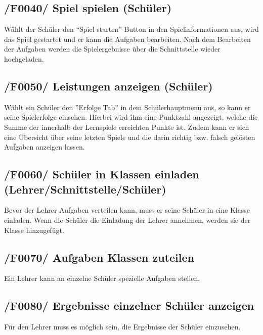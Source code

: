 \subsection{/F0040/ Spiel spielen (Schüler)}
Wählt der Schüler den “Spiel starten” Button in den Spielinformationen aus, wird das Spiel gestartet und  er kann die Aufgaben bearbeiten. Nach dem Bearbeiten der Aufgaben werden die Spielergebnisse über die Schnittstelle wieder hochgeladen.



\subsection{/F0050/ Leistungen anzeigen (Schüler)}
Wählt ein Schüler den ''Erfolge Tab'' in dem Schülerhauptmenü aus, so kann er seine Spielerfolge einsehen. Hierbei wird ihm eine Punktzahl angezeigt, welche die Summe der innerhalb der Lernspiele erreichten Punkte ist. Zudem kann er sich eine Übersicht über seine letzten Spiele und die darin richtig bzw. falsch gelösten Aufgaben anzeigen lassen.

\subsection{/F0060/ Schüler in Klassen einladen (Lehrer/Schnittstelle/Schüler)}
Bevor der Lehrer Aufgaben verteilen kann, muss er seine Schüler in eine Klasse einladen. Wenn die Schüler die Einladung der Lehrer annehmen, werden sie der Klasse hinzugefügt.

\subsection{/F0070/ Aufgaben Klassen zuteilen}
Ein Lehrer kann an einzelne Schüler spezielle Aufgaben stellen.

\subsection{/F0080/ Ergebnisse einzelner Schüler anzeigen}
Für den Lehrer muss es möglich sein, die Ergebnisse der Schüler einzusehen.
